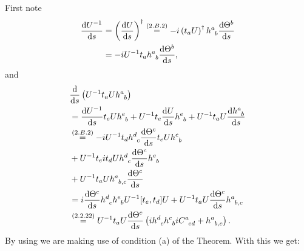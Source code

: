 \subsubsection{ }
First note
\begin{align} 
	\derivative{U^{-1}}{s}&=\left(\derivative{U}{s}\right)^\dagger\overset{\eqc{2.B.2}}{=}-i\left(t_a U\right)^\dagger h^a_{\hphantom{a}b}\derivative{\Theta^b}{s}\\
	&=-iU^{-1} t_a h^a_{\hphantom{a}b}\derivative{\Theta^b}{s},\label{eq_2_B_1}
\end{align}
and 
\begin{align} 
	&\derivative{}{s}\left(U^{-1} t_a U h^a_{\hphantom{a}b}\right)\\
	&=\derivative{U^{-1}}{s}t_e U h^e_{\hphantom{e}b}+U^{-1} t_e \derivative{U}{s}h^e_{\hphantom{e}b}+U^{-1} t_a U\derivative{h^a_{\hphantom{a}b}}{s}\\
	&\overset{\eqc{2.B.2}}{=}-iU^{-1} t_d h^d_{\hphantom{d}c}\derivative{\Theta^c}{s}t_e U h^e_{\hphantom{e}b}\\
	&+U^{-1} t_e it_d U h^d_{\hphantom{d}c}\derivative{\Theta^c}{s}h^e_{\hphantom{e}b}\\
	&+U^{-1} t_a U h^a_{\hphantom{a}b,c} \derivative{\Theta^c}{s}\\
	&=i\derivative{\Theta^c}{s}h^d_{\hphantom{d}c}h^e_{\hphantom{e}b}U^{-1}\comm{t_e}{t_d}U+U^{-1} t_a U\derivative{\Theta^c}{s}h^a_{\hphantom{a}b,c}\\
	&\overset{\eqc{2.2.22}}{=}U^{-1} t_a U\derivative{\Theta^c}{s}\left(ih^d_{\hphantom{d}c}h^e_{\hphantom{e}b}iC^a_{\hphantom{a}ed}+h^a_{\hphantom{a}b,c}\right).\label{eq_2_B_2}
\end{align}
By using  we are making use of condition (a) of the Theorem.
With this we get:
